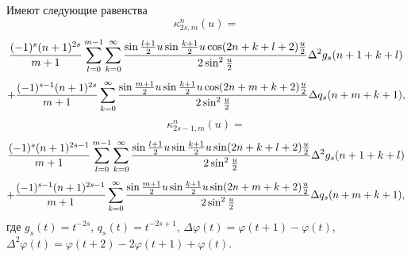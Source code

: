 \begin{lemma}\label{l6.1} Имеют следующие равенства
 $$
 \kappa_{2s,m}^n(u)=
 $$
 $$
 {(-1)^s(n+1)^{2s}\over m+1}\sum\limits_{l=0}^{m-1}
\sum\limits_{k=0}^{\infty}\frac{\sin\frac{l+1}{2}u\sin\frac{k+1}{2}u\cos(2n+k+l+2)
\frac u2}{2\sin^2\frac u2}\Delta^2g_s(n+1+k+l)
$$
 \begin{equation}\label{6.11}
    +{(-1)^{s-1}(n+1)^{2s}\over m+1}\sum\limits_{k=0}^{\infty}
\frac{\sin\frac {m+1}{2}u\sin\frac{k+1}{2}u\cos(2n+m+k+2)\frac u2}{2\sin^2\frac u2}
\Delta q_s(n+m+k+1),
 \end{equation}
$$
 \kappa_{2s-1,m}^n(u)=
 $$
 $$
 {(-1)^s(n+1)^{2s-1}\over m+1}\sum\limits_{l=0}^{m-1}
\sum\limits_{k=0}^{\infty}\frac{\sin\frac{l+1}{2}u\sin\frac{k+1}{2}u\sin(2n+k+l+2)
\frac u2}{2\sin^2\frac u2}\Delta^2g_s(n+1+k+l)
 $$
 \begin{equation}\label{6.12}
 +{(-1)^{s-1}(n+1)^{2s-1}\over m+1}\sum\limits_{k=0}^{\infty}
\frac{\sin\frac {m+1}{2}u\sin\frac{k+1}{2}u\sin(2n+m+k+2)\frac u2}{2\sin^2\frac u2}
\Delta q_s(n+m+k+1),
  \end{equation}
 где $g_s(t)=t^{-2s}$, $q_s(t)=t^{-2s+1}$, $\Delta\varphi(t)=\varphi(t+1)-\varphi(t)$,
 $\Delta^2\varphi(t)=\varphi(t+2)-2\varphi(t+1)+\varphi(t)$.
\end{lemma}
